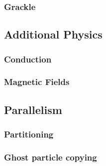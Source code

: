 \subsubsection{Grackle}

\subsection{Additional Physics}
\subsubsection{Conduction}
\subsubsection{Magnetic Fields}

\subsection{Parallelism}
\subsubsection{Partitioning}
\subsubsection{Ghost particle copying}
